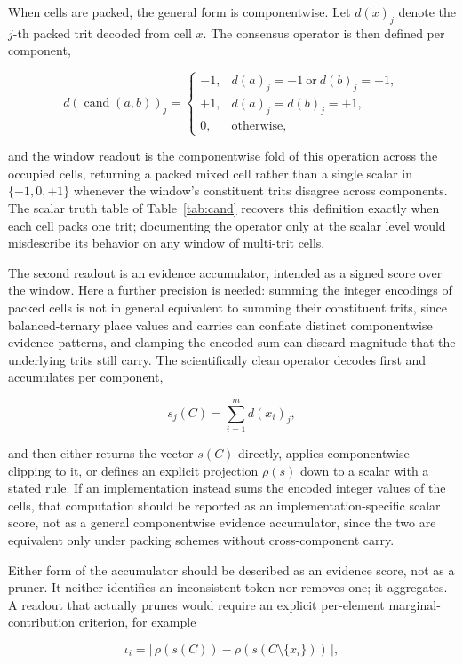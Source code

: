 \documentclass[11pt]{article}
\begin{document}
When cells are packed, the general form is componentwise. Let $d(x)_j$ denote the $j$-th packed trit decoded from cell $x$. The consensus operator is then defined per component,

\[
d(\operatorname{cand}(a,b))_j =
\begin{cases}
-1, & d(a)_j = -1 \ \text{or}\ d(b)_j = -1, \\
+1, & d(a)_j = d(b)_j = +1, \\
0, & \text{otherwise},
\end{cases}
\]

and the window readout is the componentwise fold of this operation across the occupied cells, returning a packed mixed cell rather than a single scalar in $\{-1,0,+1\}$ whenever the window's constituent trits disagree across components. The scalar truth table of Table~\ref{tab:cand} recovers this definition exactly when each cell packs one trit; documenting the operator only at the scalar level would misdescribe its behavior on any window of multi-trit cells.

The second readout is an evidence accumulator, intended as a signed score over the window. Here a further precision is needed: summing the integer encodings of packed cells is not in general equivalent to summing their constituent trits, since balanced-ternary place values and carries can conflate distinct componentwise evidence patterns, and clamping the encoded sum can discard magnitude that the underlying trits still carry. The scientifically clean operator decodes first and accumulates per component,

\[
s_j(C) = \sum_{i=1}^{m} d(x_i)_j,
\]

and then either returns the vector $s(C)$ directly, applies componentwise clipping to it, or defines an explicit projection $\rho(s)$ down to a scalar with a stated rule. If an implementation instead sums the encoded integer values of the cells, that computation should be reported as an implementation-specific scalar score, not as a general componentwise evidence accumulator, since the two are equivalent only under packing schemes without cross-component carry.

Either form of the accumulator should be described as an evidence score, not as a pruner. It neither identifies an inconsistent token nor removes one; it aggregates. A readout that actually prunes would require an explicit per-element marginal-contribution criterion, for example

\[
\iota_i = |\,\rho(s(C)) - \rho(s(C \setminus \{x_i\}))\,|,
\]
\end{document}
